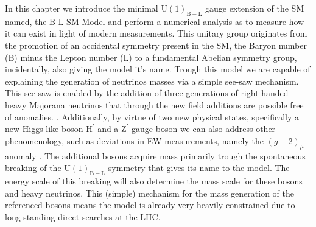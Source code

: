 \documentclass[10pt]{book}
\newcommand{\U}[1]{\mathrm{U}(1)_{\mathrm{#1}}}
\renewcommand{\(}{\left(}
\renewcommand{\)}{\right)}
\renewcommand{\[}{\left[}
\renewcommand{\]}{\right]}
\begin{document}
In this chapter we introduce the minimal $\U{B-L}$ gauge extension of the SM named, the B-L-SM Model \cite{Mohapatra:1980qe} and perform a numerical analysis as to measure how it can exist in light of modern measurements. This unitary group originates from the promotion of an accidental symmetry present in the SM, the Baryon number (B) minus the Lepton number (L) to a fundamental Abelian symmetry group, incidentally, also giving the model it's name. Trough this model we are capable of explaining the generation of neutrinos masses via a simple see-saw mechanism. This see-saw is enabled by the addition of three generations of right-handed heavy Majorana neutrinos that through the new field additions are possible free of anomalies. \cite{Yanagida:1979as}. Additionally, by virtue of two new physical states, specifically a new Higgs like boson $\mathrm{H}^\prime$ and a $\mathrm{Z}^\prime$ gauge boson we can also address other phenomenology, such as deviations in EW measurements, namely the $(g-2)_\mu$ anomaly \cite{Tanabashi2018}. The additional bosons acquire mass primarily trough the spontaneous breaking of the $\U{B-L}$ symmetry that gives its name to the model. The energy scale of this breaking will also determine the mass scale for these bosons and heavy neutrinos. This (simple) mechanism for the mass generation of the referenced bosons means the model is already very heavily constrained due to long-standing direct searches at the LHC. 
\end{document}
